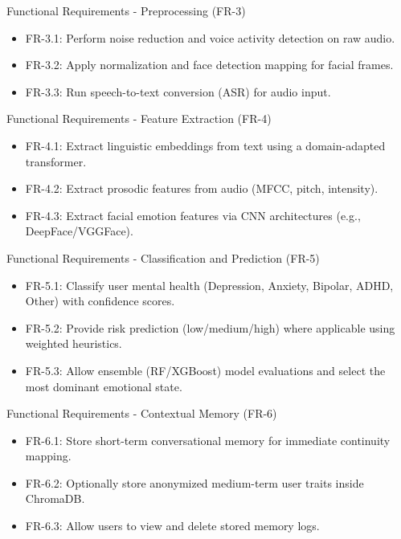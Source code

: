 \documentclass{beamer}
\begin{document}
\begin{frame}{Functional Requirements - Preprocessing (FR-3)}
\begin{itemize}
    \item FR-3.1: Perform noise reduction and voice activity detection on raw audio.
    \item FR-3.2: Apply normalization and face detection mapping for facial frames.
    \item FR-3.3: Run speech-to-text conversion (ASR) for audio input.
\end{itemize}
\end{frame}

\begin{frame}{Functional Requirements - Feature Extraction (FR-4)}
\begin{itemize}
    \item FR-4.1: Extract linguistic embeddings from text using a domain-adapted transformer.
    \item FR-4.2: Extract prosodic features from audio (MFCC, pitch, intensity).
    \item FR-4.3: Extract facial emotion features via CNN architectures (e.g., DeepFace/VGGFace).
\end{itemize}
\end{frame}

\begin{frame}{Functional Requirements - Classification and Prediction (FR-5)}
\begin{itemize}
    \item FR-5.1: Classify user mental health (Depression, Anxiety, Bipolar, ADHD, Other) with confidence scores.
    \item FR-5.2: Provide risk prediction (low/medium/high) where applicable using weighted heuristics.
    \item FR-5.3: Allow ensemble (RF/XGBoost) model evaluations and select the most dominant emotional state.
\end{itemize}
\end{frame}

\begin{frame}{Functional Requirements - Contextual Memory (FR-6)}
\begin{itemize}
    \item FR-6.1: Store short-term conversational memory for immediate continuity mapping.
    \item FR-6.2: Optionally store anonymized medium-term user traits inside ChromaDB.
    \item FR-6.3: Allow users to view and delete stored memory logs.
\end{itemize}
\end{frame}
\end{document}
